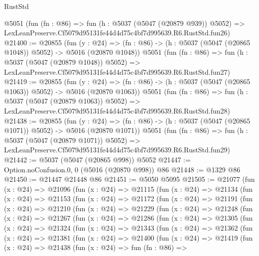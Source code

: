 \begin{lexlean}{RustStd}
\begin{coremodule}
    @5051
    (fun (fn : @86) =>
    fun (h : @5037 (@5047 (@20879 @939)) @5052) =>
    LexLeanPreserve.Cf5079d95131fe44d4d75c4bf7d995639.R6.RustStd.fun26)
@21400 := @20855
    (fun (y : @24) =>
    (fn : @86) -> (h : @5037 (@5047 (@20865 @1048)) @5052) -> @5016 (@20870 @1048))
    @5051
    (fun (fn : @86) =>
    fun (h : @5037 (@5047 (@20879 @1048)) @5052) =>
    LexLeanPreserve.Cf5079d95131fe44d4d75c4bf7d995639.R6.RustStd.fun27)
@21419 := @20855
    (fun (y : @24) =>
    (fn : @86) -> (h : @5037 (@5047 (@20865 @1063)) @5052) -> @5016 (@20870 @1063))
    @5051
    (fun (fn : @86) =>
    fun (h : @5037 (@5047 (@20879 @1063)) @5052) =>
    LexLeanPreserve.Cf5079d95131fe44d4d75c4bf7d995639.R6.RustStd.fun28)
@21438 := @20855
    (fun (y : @24) =>
    (fn : @86) -> (h : @5037 (@5047 (@20865 @1071)) @5052) -> @5016 (@20870 @1071))
    @5051
    (fun (fn : @86) =>
    fun (h : @5037 (@5047 (@20879 @1071)) @5052) =>
    LexLeanPreserve.Cf5079d95131fe44d4d75c4bf7d995639.R6.RustStd.fun29)
@21442 := @5037 (@5047 (@20865 @998)) @5052
@21447 := Option.noConfusion.{0, 0} (@5016 (@20870 @998)) @86
@21448 := @1329 @86
@21450 := @21447 @21448 @86
@21451 := @5050 @5095
@21505 := @21077
    (fun (x : @24) =>
    @21096
      (fun (x : @24) =>
      @21115
        (fun (x : @24) =>
        @21134
          (fun (x : @24) =>
          @21153
            (fun (x : @24) =>
            @21172
              (fun (x : @24) =>
              @21191
                (fun (x : @24) =>
                @21210
                  (fun (x : @24) =>
                  @21229
                    (fun (x : @24) =>
                    @21248
                      (fun (x : @24) =>
                      @21267
                        (fun (x : @24) =>
                        @21286
                          (fun (x : @24) =>
                          @21305
                            (fun (x : @24) =>
                            @21324
                              (fun (x : @24) =>
                              @21343
                                (fun (x : @24) =>
                                @21362
                                  (fun (x : @24) =>
                                  @21381
                                    (fun (x : @24) =>
                                    @21400
                                      (fun (x : @24) =>
                                      @21419
                                        (fun (x : @24) =>
                                        @21438
                                          (fun (x : @24) =>
                                          fun (fn : @86) =>

\end{coremodule}
\end{lexlean}
